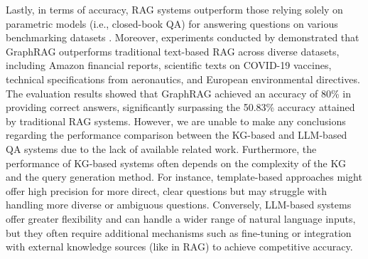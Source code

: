 Lastly, in terms of accuracy, RAG systems outperform those relying 
solely on parametric models (i.e., closed-book QA) for answering 
questions on various benchmarking datasets \citep{lewis2021retrievalaugmentedgenerationknowledgeintensivenlp}. 
Moreover, experiments conducted by \cite{aws_graphrag_accuracy} 
demonstrated that GraphRAG outperforms traditional text-based RAG across 
diverse datasets, including Amazon financial reports, scientific texts 
on COVID-19 vaccines, technical specifications from aeronautics, and 
European environmental directives. The evaluation results showed that 
GraphRAG achieved an accuracy of 80\% in providing correct answers, 
significantly surpassing the 50.83\% accuracy attained by 
traditional RAG systems. However, we are unable to make any conclusions
regarding the performance comparison between the KG-based and LLM-based
QA systems due to the lack of available related work. Furthermore, the 
performance of KG-based systems often depends on the complexity of the 
KG and the query generation method. For instance, template-based 
approaches might offer high precision for more direct, clear questions but may 
struggle with handling more diverse or ambiguous questions. 
Conversely, LLM-based systems offer greater flexibility and can handle 
a wider range of natural language inputs, but they often require 
additional mechanisms such as fine-tuning or integration with external 
knowledge sources (like in RAG) to achieve competitive accuracy.
